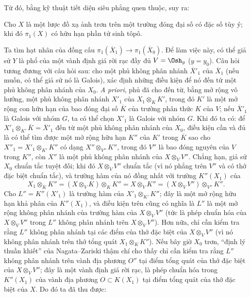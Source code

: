 Từ đó, bằng kỹ thuật tiết diện siêu phẳng quen thuộc, suy ra:

 Cho $X$ là một lược đồ xạ ảnh trơn trên một trường đóng đại
số có đặc số tùy ý; khi đó $\pi_1(X)$ có hữu hạn phần tử sinh tôpô.

Ta tìm hạt nhân của đồng cấu
$\pi_1(\overline X_1)\longrightarrow\pi_1(\overline X_0)$. Để làm việc này,
có thể giả sử $Y$ là phổ của một vành định giá rời rạc đầy đủ
$V=\Osh_y$ ($y=y_0$). Câu hỏi tương đương với câu hỏi sau: cho một phủ không
phân nhánh $\overline X'_1$ của $\overline X_1$ (nếu muốn, có thể giả sử nó là
Galois), xác định những điều kiện để nó đến từ một phủ không phân nhánh của
$X_0$. \textit{A priori}, phủ đã cho đến từ, bằng mở rộng vô hướng, một phủ
không phân nhánh $X'_1$ của $X_1\otimes_K K'$, trong đó $K'$ là một mở rộng
con hữu hạn của bao đóng đại số $\overline K$ của trường phân thức $K$ của
$V$; nếu $\overline X'_1$ là Galois với nhóm $G$, ta có thể chọn $X'_1$ là
Galois với nhóm $G$. Khi đó ta có: để
$X'_1\otimes_{K'}\overline K=\overline X'_1$ đến từ một phủ không phân nhánh
của $X_0$, điều kiện cần và đủ là có thể tìm được một mở rộng hữu hạn $K''$
của $K'$ trong $\overline K$ sao cho
$X''_1=X'_1\otimes_{K'}K''$ có dạng $X''\otimes_{V''}K''$, trong đó $V''$ là
bao đóng nguyên của $V$ trong $K''$, còn $X''$ là một phủ không phân nhánh của
$X\otimes_VV''$. Chẳng hạn, giả sử $X_0$ chuẩn tắc tuyệt đối; khi đó
$X\otimes_VV''$ chuẩn tắc (vì nó phẳng trên $V''$ và có thớ đặc biệt chuẩn
tắc), và trường hàm của nó đồng nhất với trường $K''(X_1)$ của
\[
  X_1\otimes_KK''
  =(X\otimes_VK)\otimes_KK''
  =X\otimes_VK''
  =(X\otimes_VV'')\otimes_{V''}K''.
\]
Cho $L''=K''(X'_1)$ là trường hàm của
$X'_1\otimes_{K'}K''$; đây là một mở rộng hữu hạn khả phân của $K''(X_1)$, và
điều kiện trên cũng có nghĩa là $L''$ là một mở rộng không phân nhánh của
trường hàm của $X\otimes_VV''$ (tức là phép chuẩn hóa của
$X\otimes_VV''$ trong $L''$ không phân nhánh trên $X\otimes_VV''$). Hơn nữa,
chỉ cần kiểm tra rằng $L''$ không phân nhánh tại các điểm của thớ đặc biệt của
$X\otimes_VV''$ (vì nó không phân nhánh trên thớ tổng quát
$X_1\otimes_KK''$). Nếu bây giờ $X_0$ trơn, “định lý thuần khiết” của
Nagata--Zariski thậm chí cho thấy chỉ cần kiểm tra rằng $L''$ không phân nhánh
trên vành địa phương $O''$ tại điểm tổng quát của thớ đặc biệt của
$X\otimes_VV''$; đây là một vành định giá rời rạc, là phép chuẩn hóa trong
$K''(X_1)$ của vành địa phương $O\subset K(X_1)$ tại điểm tổng quát của thớ
đặc biệt của $X$. Do đó ta đã thu được:

